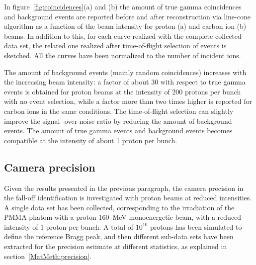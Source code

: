 In figure~\ref{fig:coincidences}(a) and (b) the amount of true gamma coincidences and background events are reported before and after reconstruction via line-cone algorithm as a function of the beam intensity for proton (a) and carbon ion (b) beams. In addition to this, for each curve realized with the complete collected data set, the related one realized after time-of-flight selection of events is sketched. All the curves have been normalized to the number of incident ions.

The amount of background events (mainly random coincidences) increases with the increasing beam intensity: a factor of about 30 with respect to true gamma events is obtained for proton beams at  the intensity of 200 protons per bunch with no event selection, while a factor more than two times higher is reported for carbon ions in the same conditions. The time-of-flight selection can slightly improve the signal -over-noise ratio by reducing the amount of background events. The amount of true gamma events and background events becomes compatible at the intensity of about 1 proton per bunch.


\subsection{Camera precision}
\label{Results::precision_reconstruction}
Given the results presented in the previous paragraph, the camera precision in the fall-off identification is investigated with proton beams at reduced intensities.
A single data set has been collected, corresponding to the irradiation of the PMMA phatom with a proton 160~MeV monoenergetic beam, with a reduced intensity of 1 proton per bunch. A total of $10^{10}$ protons has been simulated to define the reference Bragg peak, and then different sub-data sets have been extracted for the precision estimate at different statistics, as explained in section~\ref{MatMeth:precision}. 

